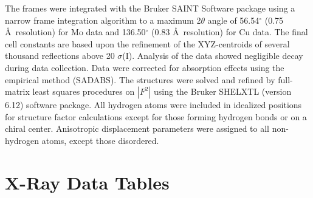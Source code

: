 The frames were integrated with the Bruker SAINT Software package using a narrow frame
integration algorithm to a maximum 2$\theta$ angle of 56.54$^\circ$ (0.75 \AA\  resolution) for Mo
data and 136.50$^\circ$ (0.83 \AA\  resolution) for Cu data. The final cell constants are based upon
the refinement of the XYZ-centroids of several thousand reflections above 20 $\sigma$(I). Analysis
of the data showed negligible decay during data collection. Data were corrected for absorption effects using the empirical method (SADABS). The
structures were solved and refined by full-matrix least squares procedures on $|F^2|$ using the
Bruker SHELXTL (version 6.12) software package. All hydrogen atoms were included in idealized positions for
structure factor calculations except for those forming hydrogen bonds or on a chiral center.
Anisotropic displacement parameters were assigned to all non-hydrogen atoms, except those
disordered.


\pagebreak
\section{X-Ray Data Tables}
